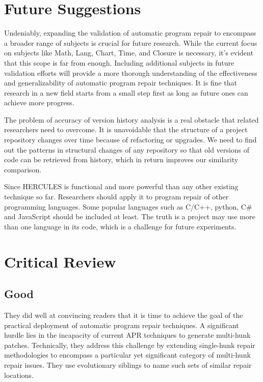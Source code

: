 \documentclass[runningheads]{llncs}
\begin{document}
\section{Future Suggestions}
Undeniably, expanding the validation of automatic program repair to encompass a broader range of subjects is crucial for future research. While the current focus on subjects like Math, Lang, Chart, Time, and Closure is necessary, it's evident that this scope is far from enough. Including additional subjects in future validation efforts will provide a more thorough understanding of the effectiveness and generalizability of automatic program repair techniques. It is fine that research in a new field starts from a small step first as long as future ones can achieve more progress. 

The problem of accuracy of version history analysis is a real obstacle that related researchers need to overcome. It is unavoidable that the structure of a project repository changes over time because of refactoring or upgrades. We need to find out the patterns in structural changes of any repository so that old versions of code can be retrieved from history, which in return improves our similarity comparison.

Since HERCULES is functional and more powerful than any other existing technique so far. Researchers should apply it to program repair of other programming languages. Some popular languages such as C/C++, python, C\# and JavaScript should be included at least. The truth is a project may use more than one language in its code, which is a challenge for future experiments.

\section{Critical Review}

\subsection{Good}
They did well at convincing readers that it is time to achieve the goal of the practical deployment of automatic program repair techniques. A significant hurdle lies in the incapacity of current APR techniques to generate multi-hunk patches. Technically, they address this challenge by extending single-hunk repair methodologies to encompass a particular yet significant category of multi-hunk repair issues. They use evolutionary siblings to name such sets of similar repair locations.
\end{document}
